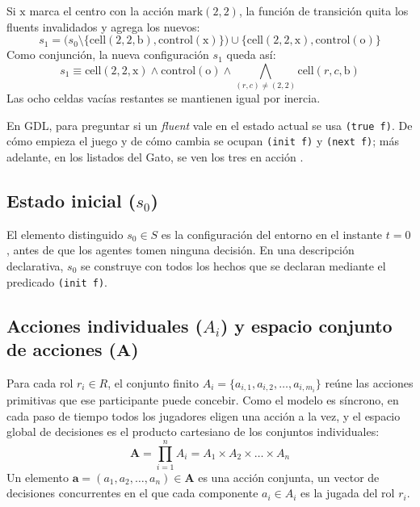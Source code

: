 Si $\text{x}$ marca el centro con la acción $\text{mark}(2, 2)$, la función de transición quita los fluents invalidados y agrega los nuevos:
\begin{equation}
    s_1 = \big( s_0 \setminus \{\text{cell}(2,2,\text{b}), \text{control}(\text{x})\} \big) \cup \{\text{cell}(2,2,\text{x}), \text{control}(\text{o})\}
    \label{eq:transicion-gato}
\end{equation}
Como conjunción, la nueva configuración $s_1$ queda así:
\begin{equation}
    s_1 \equiv \text{cell}(2,2,\text{x}) \land \text{control}(\text{o}) \land \bigwedge_{(r,c) \neq (2,2)} \text{cell}(r,c,\text{b})
    \label{eq:estado-siguiente-fluents}
\end{equation}
Las ocho celdas vacías restantes se mantienen igual por inercia.

En GDL, para preguntar si un \textit{fluent} vale en el estado actual se usa \texttt{(true f)}. De cómo empieza el juego y de cómo cambia se ocupan \texttt{(init f)} y \texttt{(next f)}; más adelante, en los listados del Gato, se ven los tres en acción \cite{Love2008GDL, GeneserethThielscher2014}.

\subsection{Estado inicial (\texorpdfstring{$s_0$}{s0})}

El elemento distinguido $s_0 \in S$ es la configuración del entorno en el instante $t = 0$, antes de que los agentes tomen ninguna decisión. En una descripción declarativa, $s_0$ se construye con todos los hechos que se declaran mediante el predicado \texttt{(init f)}.

\subsection{Acciones individuales (\texorpdfstring{$A_i$}{Ai}) y espacio conjunto de acciones (\texorpdfstring{$\mathbf{A}$}{A})}

Para cada rol $r_i \in R$, el conjunto finito $A_i = \{a_{i,1}, a_{i,2}, \dots, a_{i,m_i}\}$ reúne las acciones primitivas que ese participante puede concebir. Como el modelo es síncrono, en cada paso de tiempo todos los jugadores eligen una acción a la vez, y el espacio global de decisiones es el producto cartesiano de los conjuntos individuales:
\begin{equation}
    \mathbf{A} = \prod_{i=1}^n A_i = A_1 \times A_2 \times \dots \times A_n
    \label{eq:acciones-conjuntas}
\end{equation}
Un elemento $\mathbf{a} = (a_1, a_2, \dots, a_n) \in \mathbf{A}$ es una acción conjunta, un vector de decisiones concurrentes en el que cada componente $a_i \in A_i$ es la jugada del rol $r_i$.

